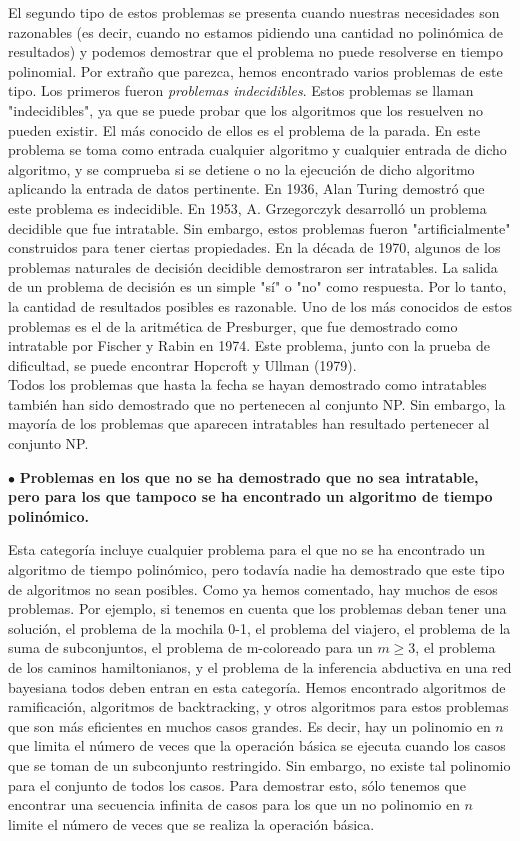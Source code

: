 El segundo tipo de estos problemas se presenta cuando nuestras necesidades son razonables (es decir, cuando no estamos pidiendo una cantidad no polinómica de resultados) y podemos demostrar que el problema no puede resolverse en tiempo polinomial. Por extraño que parezca, hemos encontrado varios problemas de este tipo. Los primeros fueron \emph{problemas indecidibles}. Estos problemas se llaman "indecidibles", ya que se puede probar que los algoritmos que los resuelven no pueden existir. El más conocido de ellos es el problema de la parada. En este problema se toma como entrada cualquier algoritmo y cualquier entrada de dicho algoritmo, y se comprueba si se detiene o no la ejecución de dicho algoritmo aplicando la entrada de datos pertinente. En 1936, Alan Turing demostró que este problema es indecidible. En 1953, A. Grzegorczyk desarrolló un problema decidible que fue intratable. Sin embargo, estos problemas fueron "artificialmente" construidos para tener ciertas propiedades. En la década de 1970, algunos de los problemas naturales de decisión decidible demostraron ser intratables. La salida de un problema de decisión es un simple "sí" o "no" como respuesta. Por lo tanto, la cantidad de resultados posibles es razonable. Uno de los más conocidos de estos problemas es el de la aritmética de Presburger, que fue demostrado como intratable por Fischer y Rabin en 1974. Este problema, junto con la prueba de dificultad, se puede encontrar Hopcroft y Ullman (1979).\\

Todos los problemas que hasta la fecha se hayan demostrado como intratables también han sido demostrado que no pertenecen al conjunto NP. Sin embargo, la mayoría de los problemas que aparecen intratables han resultado pertenecer al conjunto NP.

$\bullet$ \textbf{Problemas en los que no se ha demostrado que no sea intratable, pero para los que tampoco se ha encontrado un algoritmo de tiempo polinómico.}

Esta categoría incluye cualquier problema para el que no se ha encontrado un algoritmo de tiempo polinómico, pero todavía nadie ha demostrado que este tipo de algoritmos no sean posibles. Como ya hemos comentado, hay muchos de esos problemas. Por ejemplo, si tenemos en cuenta que los problemas deban tener una solución, el problema de la mochila 0-1, el problema del viajero, el problema de la suma de subconjuntos, el problema de m-coloreado para un $m \geq 3$, el problema de los caminos hamiltonianos, y el problema de la inferencia abductiva en una red bayesiana todos deben entran en esta categoría. Hemos encontrado algoritmos de ramificación, algoritmos de backtracking, y otros algoritmos para estos problemas que son más eficientes en muchos casos grandes. Es decir, hay un polinomio en $n$ que limita el número de veces que la operación básica se ejecuta cuando los casos que se toman de un subconjunto restringido. Sin embargo, no existe tal polinomio para el conjunto de todos los casos. Para demostrar esto, sólo tenemos que encontrar una secuencia infinita de casos para los que un no polinomio en $n$ limite el número de veces que se realiza la operación básica.\\

